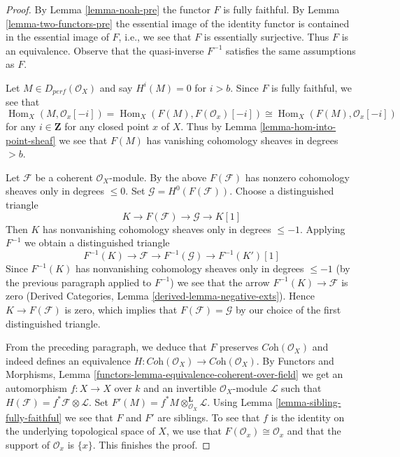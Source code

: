 \documentclass{stacks-project}
\theoremstyle{plain}
\theoremstyle{definition}
\theoremstyle{remark}
\numberwithin{equation}{subsection}
\def\Hom{\mathop{\mathrm{Hom}}\nolimits}
\begin{document}
\begin{proof}
By Lemma \ref{lemma-noah-pre} the functor $F$ is fully faithful.
By Lemma \ref{lemma-two-functors-pre} the essential image of
the identity functor is contained in the essential image of $F$, i.e.,
we see that $F$ is essentially surjective. Thus $F$ is an equivalence.
Observe that the quasi-inverse $F^{-1}$ satisfies the same assumptions
as $F$.

\medskip\noindent
Let $M \in D_{perf}(\mathcal{O}_X)$ and say $H^i(M) = 0$ for $i > b$.
Since $F$ is fully faithful, we see that
$$
\Hom_X(M, \mathcal{O}_x[-i]) =
\Hom_X(F(M), F(\mathcal{O}_x)[-i]) \cong
\Hom_X(F(M), \mathcal{O}_x[-i])
$$
for any $i \in \mathbf{Z}$ for any closed point $x$ of $X$.
Thus by Lemma \ref{lemma-hom-into-point-sheaf} we see that $F(M)$
has vanishing cohomology sheaves in degrees $> b$.

\medskip\noindent
Let $\mathcal{F}$ be a coherent $\mathcal{O}_X$-module. By
the above $F(\mathcal{F})$ has nonzero cohomology sheaves
only in degrees $\leq 0$.
Set $\mathcal{G} = H^0(F(\mathcal{F}))$. Choose a distinguished
triangle
$$
K \to F(\mathcal{F}) \to \mathcal{G} \to K[1]
$$
Then $K$ has nonvanishing cohomology sheaves only in
degrees $\leq -1$.
Applying $F^{-1}$ we obtain a distinguished triangle
$$
F^{-1}(K) \to \mathcal{F} \to F^{-1}(\mathcal{G}) \to F^{-1}(K')[1]
$$
Since $F^{-1}(K)$ has nonvanishing cohomology sheaves only
in degrees $\leq -1$ (by the previous paragraph applied to $F^{-1}$)
we see that the arrow $F^{-1}(K) \to \mathcal{F}$ is zero
(Derived Categories, Lemma \ref{derived-lemma-negative-exts}).
Hence $K \to F(\mathcal{F})$ is zero, which implies
that $F(\mathcal{F}) = \mathcal{G}$ by our choice of the
first distinguished triangle.

\medskip\noindent
From the preceding paragraph, we deduce that $F$ preserves
$\textit{Coh}(\mathcal{O}_X)$ and indeed defines an equivalence
$H : \textit{Coh}(\mathcal{O}_X) \to \textit{Coh}(\mathcal{O}_X)$.
By Functors and Morphisms, Lemma
\ref{functors-lemma-equivalence-coherent-over-field}
we get an automorphism $f : X \to X$ over $k$
and an invertible $\mathcal{O}_X$-module $\mathcal{L}$
such that $H(\mathcal{F}) = f^*\mathcal{F} \otimes \mathcal{L}$.
Set $F'(M) = f^*M \otimes_{\mathcal{O}_X}^\mathbf{L} \mathcal{L}$.
Using Lemma \ref{lemma-sibling-fully-faithful}
we see that $F$ and $F'$ are siblings.
To see that $f$ is the identity on the underlying topological
space of $X$, we use that $F(\mathcal{O}_x) \cong \mathcal{O}_x$
and that the support of $\mathcal{O}_x$ is $\{x\}$.
This finishes the proof.
\end{proof}
\end{document}
